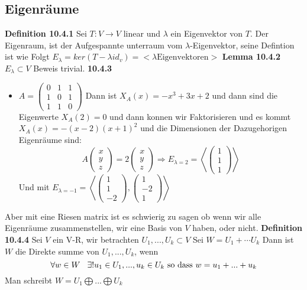 \documentclass{article}
\newcommand{\smspc}{\hspace{0.3cm}}
\begin{document}
\subsection{Eigenräume}\textbf{Definition 10.4.1} Sei $T:V\rightarrow V$ linear und $\lambda$ ein Eigenvektor von $T$. Der Eigenraum, ist der Aufgespannte unterraum vom $\lambda$-Eigenvektor, seine Defintion ist wie Folgt $E_\lambda=ker(T-\lambda id_v)=<\lambda\text{Eigenvektoren}>$
\newline\textbf{Lemma 10.4.2} $E_\lambda\subset V$ Beweis trivial.\newline
\textbf{10.4.3}\begin{itemize}
  \item{$A=\begin{pmatrix}0&1&1\\1&0&1\\1&1&0\end{pmatrix}$ Dann ist $X_A(x)=-x^3+3x+2$ und dann sind die Eigenwerte $X_A(2)=0$ und dann konnen wir Faktorisieren und es kommt $X_A(x)=-(x-2)(x+1)^2$ und die Dimensionen der Dazugehorigen Eigenräume sind:\[A\begin{pmatrix}x\\y\\z\end{pmatrix}=2\begin{pmatrix}x\\y\\z\end{pmatrix}\Rightarrow E_{\lambda=2}=\left<\begin{pmatrix}1\\1\\1\end{pmatrix}\right>\]
    Und mit $E_{\lambda=-1}=\left<\begin{pmatrix}1\\1\\-2\end{pmatrix},\begin{pmatrix}1\\-2\\1\end{pmatrix}\right>$}
\end{itemize}
Aber mit eine Riesen matrix ist es schwierig zu sagen ob wenn wir alle Eigenräume zusammenstellen, wir eine Basis von $V$ haben, oder nicht. \newline
\textbf{Definition 10.4.4} Sei $V$ ein V-R, wir betrachten $U_1, ..., U_k\subset V$ Sei $W=U_1+\cdots U_k$ Dann ist $W$ die Direkte summe von $U_1,...,U_k$, wenn \[\forall w \in W\smspc \exists!u_1\in U_1,..., u_k\in U_k\text{ so dass } w=u_1+...+u_k\] Man schreibt $W=U_1\bigoplus...\bigoplus U_k$
\end{document}
